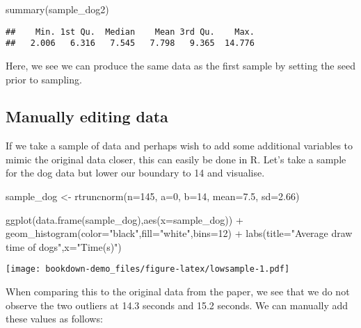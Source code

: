 \documentclass[
]{book}
\newenvironment{Shaded}{\begin{snugshade}}{\end{snugshade}}
\newcommand{\AttributeTok}[1]{\textcolor[rgb]{0.77,0.63,0.00}{#1}}
\newcommand{\DecValTok}[1]{\textcolor[rgb]{0.00,0.00,0.81}{#1}}
\newcommand{\FloatTok}[1]{\textcolor[rgb]{0.00,0.00,0.81}{#1}}
\newcommand{\FunctionTok}[1]{\textcolor[rgb]{0.00,0.00,0.00}{#1}}
\newcommand{\NormalTok}[1]{#1}
\newcommand{\OtherTok}[1]{\textcolor[rgb]{0.56,0.35,0.01}{#1}}
\newcommand{\SpecialCharTok}[1]{\textcolor[rgb]{0.00,0.00,0.00}{#1}}
\newcommand{\StringTok}[1]{\textcolor[rgb]{0.31,0.60,0.02}{#1}}
\begin{document}
\begin{Shaded}
\begin{Highlighting}[]
\FunctionTok{summary}\NormalTok{(sample\_dog2)}
\end{Highlighting}
\end{Shaded}

\begin{verbatim}
##    Min. 1st Qu.  Median    Mean 3rd Qu.    Max. 
##   2.006   6.316   7.545   7.798   9.365  14.776
\end{verbatim}

Here, we see we can produce the same data as the first sample by setting the seed prior to sampling.

\hypertarget{manually-editing-data}{%
\subsection{Manually editing data}\label{manually-editing-data}}

If we take a sample of data and perhaps wish to add some additional variables to mimic the original data closer, this can easily be done in R. Let's take a sample for the dog data but lower our boundary to 14 and visualise.

\begin{Shaded}
\begin{Highlighting}[]
\NormalTok{sample\_dog }\OtherTok{\textless{}{-}} \FunctionTok{rtruncnorm}\NormalTok{(}\AttributeTok{n=}\DecValTok{145}\NormalTok{, }\AttributeTok{a=}\DecValTok{0}\NormalTok{, }\AttributeTok{b=}\DecValTok{14}\NormalTok{, }\AttributeTok{mean=}\FloatTok{7.5}\NormalTok{, }\AttributeTok{sd=}\FloatTok{2.66}\NormalTok{)}

\FunctionTok{ggplot}\NormalTok{(}\FunctionTok{data.frame}\NormalTok{(sample\_dog),}\FunctionTok{aes}\NormalTok{(}\AttributeTok{x=}\NormalTok{sample\_dog)) }\SpecialCharTok{+}
  \FunctionTok{geom\_histogram}\NormalTok{(}\AttributeTok{color=}\StringTok{"black"}\NormalTok{,}\AttributeTok{fill=}\StringTok{"white"}\NormalTok{,}\AttributeTok{bins=}\DecValTok{12}\NormalTok{) }\SpecialCharTok{+} 
            \FunctionTok{labs}\NormalTok{(}\AttributeTok{title=}\StringTok{"Average draw time of dogs"}\NormalTok{,}\AttributeTok{x=}\StringTok{"Time(s)"}\NormalTok{)}
\end{Highlighting}
\end{Shaded}

\texttt{[image: bookdown-demo\_files/figure-latex/lowsample-1.pdf]}

When comparing this to the original data from the paper, we see that we do not observe the two outliers at 14.3 seconds and 15.2 seconds. We can manually add these values as follows:
\end{document}

